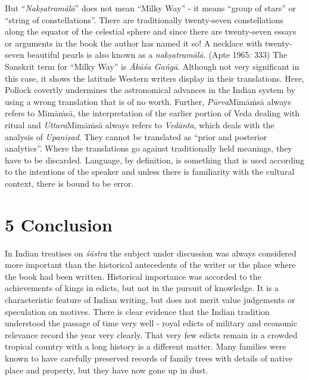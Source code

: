 But “\textit{Nakṣatramālā}” does not mean “Milky Way” - it means “group of stars” or “string of constellations”. There are traditionally twenty-seven constellations along the equator of the celestial sphere and since there are twenty-seven essays or arguments in the book the author has named it so! A necklace with twenty-seven beautiful pearls is also known as a \textit{nakṣatramālā.} (Apte 1965: 333) The Sanskrit term for “Milky Way” is \textit{Ākāśa Gańgā}. Although not very significant in this case, it shows the latitude Western writers display in their translations. Here, Pollock covertly undermines the astronomical advances in the Indian system by using a wrong translation that is of no worth. Further, \textit{Pūrva}Mīmāṁsā always refers to Mīmāṁsā, the interpretation of the earlier portion of Veda dealing with ritual and \textit{Uttara}Mīmāṁsā always refers to \textit{Vedānta}, which deals with the analysis of \textit{Upaniṣad}. They cannot be translated as “prior and posterior analytics”. Where the translations go against traditionally held meanings, they have to be discarded. Language, by definition, is something that is used according to the intentions of the speaker and unless there is familiarity with the cultural context, there is bound to be error.


\section*{5 Conclusion}

In Indian treatises on \textit{śāstra} the subject under discussion was always considered more important than the historical antecedents of the writer or the place where the book had been written. Historical importance was accorded to the achievements of kings in edicts, but not in the pursuit of knowledge. It is a characteristic feature of Indian writing, but does not merit value judgements or speculation on motives. There is clear evidence that the Indian tradition understood the passage of time very well - royal edicts of military and economic relevance record the year very clearly. That very few edicts remain in a crowded tropical country with a long history is a different matter. Many families were known to have carefully preserved records of family trees with details of native place and property, but they have now gone up in dust.

